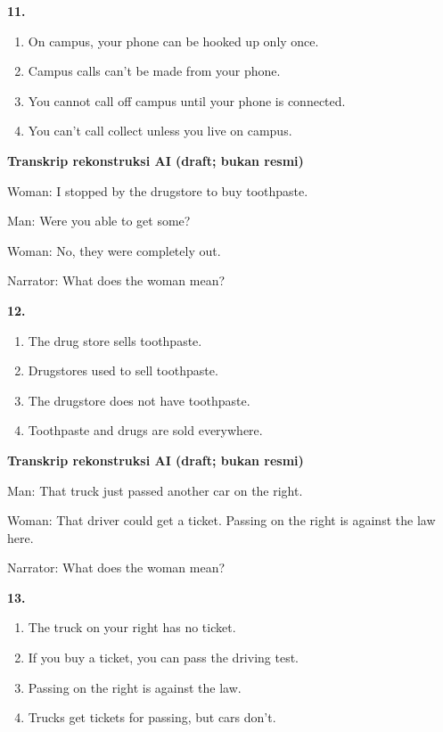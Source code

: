 \documentclass[12pt]{article}
\begin{document}
\noindent\textbf{11.}
\begin{enumerate}[label=(\Alph*),leftmargin=*,itemsep=0.2em]
\item On campus, your phone can be hooked up only once.
\item Campus calls can't be made from your phone.
\item You cannot call off campus until your phone is connected.
\item You can't call collect unless you live on campus.
\end{enumerate}
\par
\vspace{0.25\baselineskip}
\begin{exampleblock}
\textbf{Transkrip rekonstruksi AI (draft; bukan resmi)}\par
Woman: I stopped by the drugstore to buy toothpaste.\par
Man: Were you able to get some?\par
Woman: No, they were completely out.\par
Narrator: What does the woman mean?\par
\end{exampleblock}
\noindent\textbf{12.}
\begin{enumerate}[label=(\Alph*),leftmargin=*,itemsep=0.2em]
\item The drug store sells toothpaste.
\item Drugstores used to sell toothpaste.
\item The drugstore does not have toothpaste.
\item Toothpaste and drugs are sold everywhere.
\end{enumerate}
\par
\vspace{0.25\baselineskip}
\begin{exampleblock}
\textbf{Transkrip rekonstruksi AI (draft; bukan resmi)}\par
Man: That truck just passed another car on the right.\par
Woman: That driver could get a ticket. Passing on the right is against the law here.\par
Narrator: What does the woman mean?\par
\end{exampleblock}
\noindent\textbf{13.}
\begin{enumerate}[label=(\Alph*),leftmargin=*,itemsep=0.2em]
\item The truck on your right has no ticket.
\item If you buy a ticket, you can pass the driving test.
\item Passing on the right is against the law.
\item Trucks get tickets for passing, but cars don't.
\end{enumerate}
\end{document}
